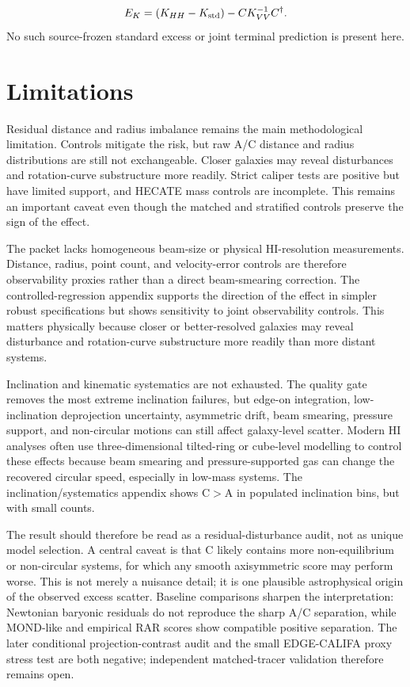 \documentclass[11pt]{article}
\begin{document}
\begin{equation}
E_K=(K_{HH}-K_{\rm std})-CK_{VV}^{-1}C^\dagger.
\end{equation}
No such source-frozen standard excess or joint terminal prediction is present here.

\section{Limitations}
Residual distance and radius imbalance remains the main methodological limitation. Controls mitigate the risk, but raw A/C distance and radius distributions are still not exchangeable. Closer galaxies may reveal disturbances and rotation-curve substructure more readily. Strict caliper tests are positive but have limited support, and HECATE mass controls are incomplete. This remains an important caveat even though the matched and stratified controls preserve the sign of the effect.

The packet lacks homogeneous beam-size or physical HI-resolution measurements. Distance, radius, point count, and velocity-error controls are therefore observability proxies rather than a direct beam-smearing correction. The controlled-regression appendix supports the direction of the effect in simpler robust specifications but shows sensitivity to joint observability controls. This matters physically because closer or better-resolved galaxies may reveal disturbance and rotation-curve substructure more readily than more distant systems.

Inclination and kinematic systematics are not exhausted. The quality gate removes the most extreme inclination failures, but edge-on integration, low-inclination deprojection uncertainty, asymmetric drift, beam smearing, pressure support, and non-circular motions can still affect galaxy-level scatter. Modern HI analyses often use three-dimensional tilted-ring or cube-level modelling to control these effects because beam smearing and pressure-supported gas can change the recovered circular speed, especially in low-mass systems. The inclination/systematics appendix shows C$>$A in populated inclination bins, but with small counts.

The result should therefore be read as a residual-disturbance audit, not as unique model selection. A central caveat is that C likely contains more non-equilibrium or non-circular systems, for which any smooth axisymmetric score may perform worse. This is not merely a nuisance detail; it is one plausible astrophysical origin of the observed excess scatter. Baseline comparisons sharpen the interpretation: Newtonian baryonic residuals do not reproduce the sharp A/C separation, while MOND-like and empirical RAR scores show compatible positive separation. The later conditional projection-contrast audit and the small EDGE-CALIFA proxy stress test are both negative; independent matched-tracer validation therefore remains open.
\end{document}
